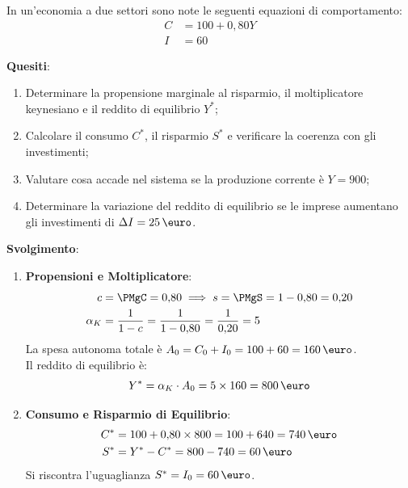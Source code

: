 \begin{esercizio}
In un'economia a due settori sono note le seguenti equazioni di comportamento:
\begin{align*}
    C &= 100 + 0{,}80 Y \\
    I &= 60
\end{align*}

\textbf{Quesiti}:
\begin{enumerate}
    \item Determinare la propensione marginale al risparmio, il moltiplicatore keynesiano e il reddito di equilibrio $Y^*$;
    \item Calcolare il consumo $C^*$, il risparmio $S^*$ e verificare la coerenza con gli investimenti;
    \item Valutare cosa accade nel sistema se la produzione corrente è $Y = 900$;
    \item Determinare la variazione del reddito di equilibrio se le imprese aumentano gli investimenti di $\Delta I = 25\,\text{\euro}$.
\end{enumerate}

\textbf{Svolgimento}:
\begin{enumerate}
    \item \textbf{Propensioni e Moltiplicatore}:
    \begin{align*}
        c &= \PMgC = 0{,}80 \implies s = \PMgS = 1 - 0{,}80 = 0{,}20 \\
        \alpha_K &= \frac{1}{1 - c} = \frac{1}{1 - 0{,}80} = \frac{1}{0{,}20} = 5
    \end{align*}
    La spesa autonoma totale è $A_0 = C_0 + I_0 = 100 + 60 = 160\,\text{\euro}$.\\
    Il reddito di equilibrio è:
    \begin{equation*}
        Y^* = \alpha_K \cdot A_0 = 5 \times 160 = 800\,\text{\euro}
    \end{equation*}
    
    \item \textbf{Consumo e Risparmio di Equilibrio}:
    \begin{align*}
        C^* &= 100 + 0{,}80 \times 800 = 100 + 640 = 740\,\text{\euro} \\
        S^* &= Y^* - C^* = 800 - 740 = 60\,\text{\euro}
    \end{align*}
    Si riscontra l'uguaglianza $S^* = I_0 = 60\,\text{\euro}$.
    

\end{enumerate}
\end{esercizio}
